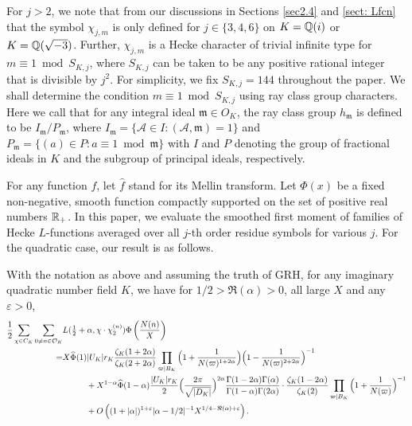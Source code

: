 \documentclass[twoside,leqno,10pt, A4]{amsart}
\begin{document}
  For $j>2$, we note that from our discussions in Sections \ref{sec2.4} and \ref{sect: Lfcn} that the symbol $\chi_{j,m}$ is only defined for $j \in \{3, 4, 6\}$ on $K=\mathbb Q(i)$ or $K=\mathbb Q(\sqrt{-3})$. Further, $\chi_{j,m}$ is a Hecke character of trivial infinite
type for $m \equiv 1 \bmod S_{K,j}$, where $S_{K,j}$ can be taken to be any positive rational integer that is divisible by $j^2$. For
simplicity, we fix $S_{K,j}=144$ throughout the paper. We shall determine the condition $m \equiv 1 \bmod S_{K,j}$ using ray class group
characters. Here we call that for any integral ideal $\mathfrak{m} \in O_K$, the ray class group $h_{\mathfrak{m} }$ is defined to be $I_{\mathfrak{m} }/P_{\mathfrak{m} }$, where $I_{\mathfrak{m} } = \{
\mathcal{A} \in I : (\mathcal{A}, \mathfrak{m} ) = 1 \}$ and $P_{\mathfrak{m} } = \{(a) \in P : a \equiv 1 \bmod \mathfrak{m}  \}$ with $I$ and $P$ denoting the group of
fractional ideals in $K$ and the subgroup of principal ideals, respectively. \newline

 For any function $f$, let $\widehat f$ stand for its Mellin transform. Let $\Phi(x)$ be a fixed non-negative, smooth function compactly
supported on the set of positive real numbers ${\mathbb R}_+$. In this paper, we evaluate the smoothed first moment of families of Hecke
$L$-functions averaged over all $j$-th order residue symbols for various $j$. For the quadratic case, our result is as follows.
\begin{theorem} \label{Thmfirstmoment}
With the notation as above and assuming the truth of GRH, for any imaginary quadratic number field $K$, we have for $1/2>\Re(\alpha)>0$, all large
$X$ and any $\varepsilon>0$,
\begin{align} \label{FirstmomentSmoothed}
\begin{split}
 \frac {1}{2}\sum_{\chi \in C_{K}} \sum_{0 \neq n \in \mathcal O_K} & L(\tfrac{1}{2}+\alpha, \chi \cdot \chi^{(n)}_{2})\Phi \left( \frac
{N(n)}X \right) \\
=& X\widehat \Phi(1)|U_K|r_K \frac{\zeta_K(1+2\alpha)}{\zeta_K(2+2\alpha)}\prod_{\varpi | B_K}\Big(1+\frac 1{N(\varpi)^{1+2\alpha}}\Big
)\Big(1-\frac 1{N(\varpi)^{2+2\alpha}}\Big )^{-1} \\
& \hspace*{1cm}+ X^{1-\alpha}\widehat \Phi(1-\alpha)\frac {|U_K|r_K}{2} \Big(\frac {2\pi}{\sqrt{|D_K|}}\Big )^{2\alpha} \frac{\Gamma (1-2\alpha)\Gamma (
\alpha)}{\Gamma(1-\alpha)\Gamma (2\alpha)}\cdot\frac{\zeta_K(1-2\alpha)}{\zeta_K(2)}\prod_{\varpi | B_K}\Big(1+\frac 1{N(\varpi)}\Big
)^{-1} \\
& \hspace*{1cm} +O\left((1+|\alpha|)^{1+\varepsilon}|\alpha-1/2|^{-1}X^{1/4-\Re(\alpha)+\varepsilon}\right).
\end{split}
\end{align}
\end{theorem}
\end{document}
